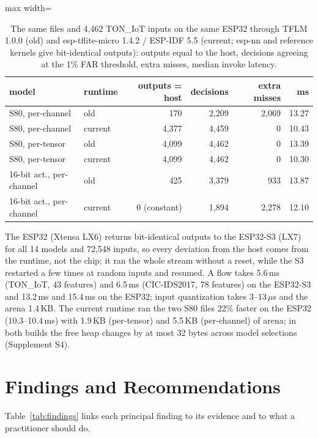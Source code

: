 \documentclass[sigplan,10pt,review,anonymous,nonacm]{acmart}
\newcommand{\cic}{CIC-IDS2017\xspace}
\newcommand{\ton}{TON\_IoT\xspace}
\begin{document}
\begin{table}[t]
\caption{The same files and 4,462 \ton inputs on the same ESP32 through TFLM 1.0.0 (old) and
esp-tflite-micro 1.4.2 / ESP-IDF 5.5 (current; esp-nn and reference kernels give bit-identical outputs):
outputs equal to the host, decisions agreeing at the 1\% FAR threshold, extra misses, median invoke latency.}
\label{tab:runtime}
\small\setlength{\tabcolsep}{2pt}
\begin{adjustbox}{max width=\columnwidth}
\begin{tabular}{llrrrr}
\toprule
model & runtime & outputs = host & decisions & extra misses & ms \\
\midrule
S80, per-channel & old & 170 & 2,209 & 2,069 & 13.27 \\
S80, per-channel & current & 4,377 & 4,459 & 0 & 10.43 \\
S80, per-tensor & old & 4,099 & 4,462 & 0 & 13.39 \\
S80, per-tensor & current & 4,099 & 4,462 & 0 & 10.30 \\
16-bit act., per-channel & old & 425 & 3,379 & 933 & 13.87 \\
16-bit act., per-channel & current & 0 (constant) & 1,894 & 2,278 & 12.10 \\
\bottomrule
\end{tabular}
\end{adjustbox}
\end{table}
The ESP32 (Xtensa LX6) returns bit-identical outputs to the ESP32-S3 (LX7) for all 14 models and
72,548 inputs, so every deviation from the host comes from the runtime, not the chip; it ran the
whole stream without a reset, while the S3 restarted a few times at random inputs and resumed. A flow
takes 5.6\,ms (\ton, 43 features) and 6.5\,ms (\cic, 78 features) on the ESP32-S3 and 13.2\,ms and
15.4\,ms on the ESP32; input quantization takes 3--13\,$\mu$s and the arena 1.4\,KB. The current
runtime ran the two S80 files 22\% faster on the ESP32 (10.3--10.4\,ms) with 1.9\,KB (per-tensor) and 5.5\,KB (per-channel) of arena;
in both builds the free heap changes by at most 32 bytes across model selections (Supplement S4).

\section{Findings and Recommendations}\label{sec:recs}
Table~\ref{tab:findings} links each principal finding to its evidence and to what a practitioner should do.
\end{document}
